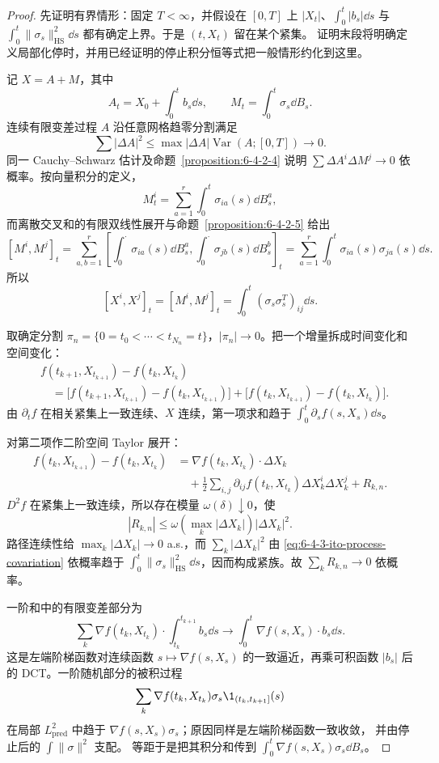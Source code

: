 \begin{proof}
先证明有界情形：固定 $T<\infty$，并假设在 $[0,T]$ 上
$|X_t|$、$\int_0^t|b_s|\dd s$ 与
$\int_0^t\|\sigma_s\|_{\mathrm{HS}}^2\dd s$ 都有确定上界。于是 $(t,X_t)$ 留在某个紧集。
证明末段将明确定义局部化停时，并用已经证明的停止积分恒等式把一般情形约化到这里。

记 $X=A+M$，其中
\[
 A_t=X_0+\int_0^tb_s\dd s,
 \qquad M_t=\int_0^t\sigma_s\dd B_s.
\]
连续有限变差过程 $A$ 沿任意网格趋零分割满足
\[
 \sum|\Delta A|^2
 \le\max|\Delta A|\operatorname{Var}(A;[0,T])\longrightarrow0.
\]
同一 Cauchy--Schwarz 估计及命题~\ref{proposition:6-4-2-4} 说明
$\sum\Delta A^i\Delta M^j\to0$ 依概率。按向量积分的定义，
\[
 M_t^i=\sum_{a=1}^r\int_0^t\sigma_{ia}(s)\dd B_s^a,
\]
而离散交叉和的有限双线性展开与命题~\ref{proposition:6-4-2-5} 给出
\[
 [M^i,M^j]_t
 =\sum_{a,b=1}^r
 \left[\int_0^\cdot\sigma_{ia}(s)\dd B_s^a,
       \int_0^\cdot\sigma_{jb}(s)\dd B_s^b\right]_t
 =\sum_{a=1}^r\int_0^t\sigma_{ia}(s)\sigma_{ja}(s)\dd s.
\]
所以
\begin{equation}\label{eq:6-4-3-ito-process-covariation}
 [X^i,X^j]_t=[M^i,M^j]_t
 =\int_0^t(\sigma_s\sigma_s^T)_{ij}\dd s.
\end{equation}

取确定分割 $\pi_n=\{0=t_0<\cdots<t_{N_n}=t\}$，$|\pi_n|\to0$。把一个增量拆成时间变化和
空间变化：
\begin{align*}
 &f(t_{k+1},X_{t_{k+1}})-f(t_k,X_{t_k})\\
 &\quad=
 \bigl[f(t_{k+1},X_{t_{k+1}})-f(t_k,X_{t_{k+1}})\bigr]
 +\bigl[f(t_k,X_{t_{k+1}})-f(t_k,X_{t_k})\bigr].
\end{align*}
由 $\partial_tf$ 在相关紧集上一致连续、$X$ 连续，第一项求和趋于
$\int_0^t\partial_sf(s,X_s)\dd s$。

对第二项作二阶空间 Taylor 展开：
\begin{align*}
 f(t_k,X_{t_{k+1}})-f(t_k,X_{t_k})
 &=\nabla f(t_k,X_{t_k})\cdot\Delta X_k\\
 &\quad+\frac12\sum_{i,j}\partial_{ij}f(t_k,X_{t_k})
      \Delta X_k^i\Delta X_k^j+R_{k,n}.
\end{align*}
$D^2f$ 在紧集上一致连续，所以存在模量 $\omega(\delta)\downarrow0$，使
\[
 |R_{k,n}|\le\omega\!\left(\max_k|\Delta X_k|\right)|\Delta X_k|^2.
\]
路径连续性给 $\max_k|\Delta X_k|\to0$ a.s.，而
$\sum_k|\Delta X_k|^2$ 由
\eqref{eq:6-4-3-ito-process-covariation} 依概率趋于
$\int_0^t\|\sigma_s\|_{\mathrm{HS}}^2\dd s$，因而构成紧族。故
$\sum_kR_{k,n}\to0$ 依概率。

一阶和中的有限变差部分为
\[
 \sum_k\nabla f(t_k,X_{t_k})\cdot\int_{t_k}^{t_{k+1}}b_s\dd s
 \longrightarrow\int_0^t\nabla f(s,X_s)\cdot b_s\dd s.
\]
这是左端阶梯函数对连续函数 $s\mapsto\nabla f(s,X_s)$ 的一致逼近，再乘可积函数 $|b_s|$
后的 DCT。一阶随机部分的被积过程
\[
 \sum_k\nabla f(t_k,X_{t_k})\sigma_s\1_{(t_k,t_{k+1}]}(s)
\]
在局部 $L^2_{\mathrm{pred}}$ 中趋于 $\nabla f(s,X_s)\sigma_s$；原因同样是左端阶梯函数一致收敛，
并由停止后的 $\int\|\sigma\|^2$ 支配。\Ito{} 等距于是把其积分和传到
$\int_0^t\nabla f(s,X_s)\sigma_s\dd B_s$。


\end{proof}
